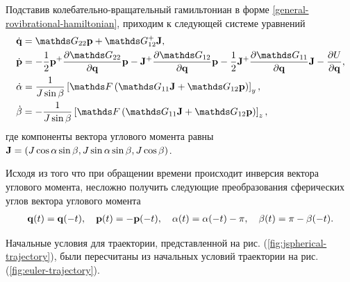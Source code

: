 Подставив колебательно-вращательный гамильтониан в форме \eqref{general-rovibrational-hamiltonian}, приходим к следующей системе уравнений
\begin{gather}
    \begin{aligned}
        &\dot{\mf{q}} = \bbG_{22} \mf{p} + \bbG_{12}^+ \mf{J}, \\
        &\dot{\mf{p}} = -\frac{1}{2} \mf{p}^+ \frac{\partial \bbG_{22}}{\partial \mf{q}} \mf{p} - \mf{J}^+ \frac{\partial \bbG_{12}}{\partial \mf{q}} \mf{p} - \frac{1}{2} \mf{J}^+ \frac{\partial \bbG_{11}}{\partial \mf{q}} \mf{J} - \frac{\partial U}{\partial \mf{q}}, \\
        &\dot{\alpha} = \frac{1}{J \sin \beta} \lsq \bbF \lb \bbG_{11} \mf{J} + \bbG_{12} \mf{p} \rb \rsq_y, \\
        &\dot{\beta} = -\frac{1}{J \sin \beta} \lsq \bbF \lb \bbG_{11} \mf{J} + \bbG_{12} \mf{p} \rb \rsq_z, 
    \end{aligned} \label{polyatom-jspherical-system}
\end{gather}
%
где компоненты вектора углового момента равны $\mathbf{J} = \left( J \cos \alpha \sin \beta, J \sin \alpha \sin \beta, J \cos \beta \right)$. \par
Исходя из того что при обращении времени происходит инверсия вектора углового момента, несложно получить следующие преобразования сферических углов вектора углового момента
\begin{gather}
    \mathbf{q}(t) = \mathbf{q}(-t), \quad \mathbf{p}(t) = -\mathbf{p}(-t), \quad \alpha(t) = \alpha(-t) - \pi, \quad \beta(t) = \pi - \beta(-t).
\end{gather}

Начальные условия для траектории, представленной на рис. (\ref{fig:jspherical-trajectory}), были пересчитаны из начальных условий траектории на рис. (\ref{fig:euler-trajectory}). 

